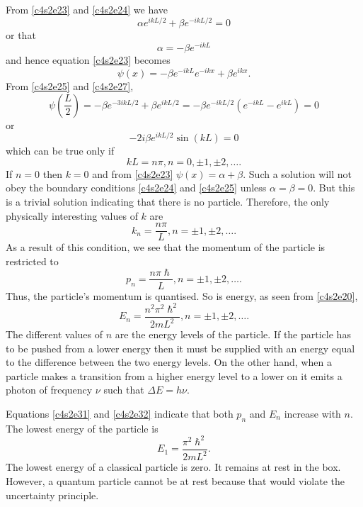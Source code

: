 From \eqref{c4s2e23} and \eqref{c4s2e24} we have
\[
\alpha e^{ikL/2} + \beta e^{-ikL/2} = 0
\]
or that
\begin{equation}\label{c4s2e26}
\alpha = -\beta e^{-ikL}
\end{equation}
and hence equation \eqref{c4s2e23} becomes
\begin{equation}\label{c4s2e27}
\psi(x) = -\beta e^{-ikL}e^{-ikx} + \beta e^{ikx}.
\end{equation}
From \eqref{c4s2e25} and \eqref{c4s2e27},
\[
\psi\left(\frac{L}{2}\right) = -\beta e^{-3ikL/2} + \beta e^{ikL/2} = 
-\beta e^{-ikL/2}(e^{-ikL} - e^{ikL}) = 0
\]
or
\begin{equation}\label{c4s2e28}
-2i\beta e^{ikL/2}\sin(kL) = 0
\end{equation}
which can be true only if
\begin{equation}\label{c4s2e29}
kL = n\pi, n = 0, \pm 1, \pm 2, \ldots.
\end{equation}
If $n = 0$ then $k = 0$ and from \eqref{c4s2e23} $\psi(x) = \alpha + \beta$. 
Such a solution will not obey the boundary conditions \eqref{c4s2e24} and
\eqref{c4s2e25} unless $\alpha = \beta = 0$. But this is a trivial solution
indicating that there is no particle. Therefore, the only physically interesting
values of $k$ are
\begin{equation}\label{c4s2e30}
k_n = \frac{n\pi}{L}, n = \pm 1, \pm 2, \ldots.
\end{equation}
As a result of this condition, we see that the momentum of the particle is
restricted to
\begin{equation}\label{c4s2e31}
p_n = \frac{n\pi\hslash}{L}, n = \pm 1, \pm 2, \ldots.
\end{equation}
Thus, the particle's momentum is quantised. So is energy, as seen from
\eqref{c4s2e20},
\begin{equation}\label{c4s2e32}
E_n = \frac{n^2\pi^2\hslash^2}{2mL^2}, n = \pm 1, \pm 2, \ldots.
\end{equation}
The different values of $n$ are the energy levels of the particle. If the 
particle has to be pushed from a lower energy then it must be supplied with an
energy equal to the difference between the two energy levels. On the other hand,
when a particle makes a transition from a higher energy level to a lower on it
emits a photon of frequency $\nu$ such that $\Delta E = h\nu$.

Equations \eqref{c4s2e31} and \eqref{c4s2e32} indicate that both $p_n$ and
$E_n$ increase with $n$. The lowest energy of the particle is
\begin{equation}\label{c4s2e33}
E_1 = \frac{\pi^2\hslash^2}{2mL^2}.
\end{equation}
The lowest energy of a classical particle is zero. It remains at rest in the 
box. However, a quantum particle cannot be at rest because that would violate
the uncertainty principle. 

